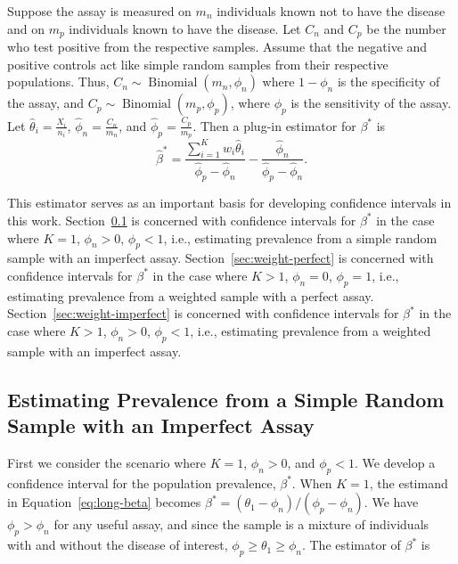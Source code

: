 Suppose the assay is measured on \( m_n \) individuals known not to have the disease and on \( m_p \) individuals known to have the disease.
Let \( C_n \) and \( C_p \) be the number who test positive from the respective samples.
Assume that the negative and positive controls act like simple random samples from their respective populations.
Thus, \( C_n \sim \operatorname{Binomial}(m_n, \phi_n) \) where \( 1 - \phi_n \) is the specificity of the assay, and \( C_p \sim \operatorname{Binomial}(m_p, \phi_p) \), where \( \phi_p \) is the sensitivity of the assay.
Let \( \hat{\theta}_i = \frac{X_i}{n_i} \), \( \hat{\phi}_n = \frac{C_n}{m_n} \), and \( \hat{\phi}_p = \frac{C_p}{m_p} \).
Then a plug-in estimator for \( \beta^* \) is
\begin{equation}
    \hat{\beta}^* = \frac{\sum_{i=1}^K w_i \hat{\theta}_i}{\hat{\phi}_p - \hat{\phi}_n} - \frac{\hat{\phi}_n}{\hat{\phi}_p - \hat{\phi}_n}. \label{eq:betastarhat}
\end{equation}

This estimator serves as an important basis for developing confidence intervals in this work.
Section~\ref{sec:srs-imperfect} is concerned with confidence intervals for \( \beta^* \) in the case where \( K = 1 \), \( \phi_n > 0 \), \( \phi_p < 1 \), i.e., estimating prevalence from a simple random sample with an imperfect assay.
Section~\ref{sec:weight-perfect} is concerned with confidence intervals for \( \beta^* \) in the case where \( K > 1 \), \( \phi_n = 0 \), \( \phi_p = 1 \), i.e., estimating prevalence from a weighted sample with a perfect assay.
Section~\ref{sec:weight-imperfect} is concerned with confidence intervals for \( \beta^* \) in the case where \( K > 1 \), \( \phi_n > 0 \), \( \phi_p < 1 \), i.e., estimating prevalence from a weighted sample with an imperfect assay.

\subsection{Estimating Prevalence from a Simple Random Sample with an Imperfect Assay}
\label{sec:srs-imperfect}

First we consider the scenario where \( K = 1 \), \( \phi_n > 0 \), and \( \phi_p < 1 \).
We develop a confidence interval for the population prevalence, \( \beta^* \).
When \( K = 1 \), the estimand in Equation~\ref{eq:long-beta} becomes $\beta^* = (\theta_1 - \phi_n)/(\phi_p-\phi_n)$. We have $\phi_p > \phi_n$ for any useful assay, and since the sample is a mixture of individuals with and without the disease of interest, $\phi_p \geq \theta_1 \geq \phi_n$. The estimator of $\beta^*$ is

